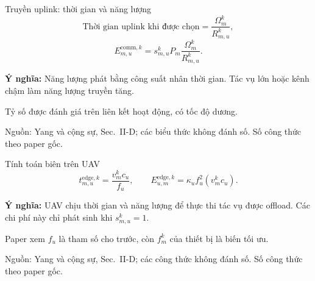 \documentclass[10pt,aspectratio=43]{beamer}
\newcommand{\source}[1]{\par\vfill{\fontsize{5.8}{7}\selectfont\color{Muted}Nguồn: #1\par}}
\newcommand{\paperref}[1]{\source{Yang và cộng sự, Sec.~#1. Số công thức theo paper gốc.}}
\newcommand{\eqmeaning}[1]{\par\medskip\textcolor{HustRed}{\textbf{Ý nghĩa:}} #1\par}
\newcommand{\noteonly}[1]{\par{\footnotesize\color{Muted}#1\par}}
\begin{document}
\begin{frame}[t]{Truyền uplink: thời gian và năng lượng}
\relax
\[
\text{Thời gian uplink khi được chọn}=\frac{\Omega_m^k}{R_{m,u}^k},
\]
\[
E_{m,u}^{\mathrm{comm},k}=s_{m,u}^kP_m\frac{\Omega_m^k}{R_{m,u}^k}.
\]
\par{}
\eqmeaning{Năng lượng phát bằng công suất nhân thời gian. Tác vụ lớn hoặc kênh chậm làm năng lượng truyền tăng.}
\noteonly{Tỷ số được đánh giá trên liên kết hoạt động, có tốc độ dương.}
\paperref{II-D; các biểu thức không đánh số}
\end{frame}

\begin{frame}[t]{Tính toán biên trên UAV}
\relax
\[
t_{m,u}^{\mathrm{edge},k}=\frac{v_m^kc_u}{f_u},\qquad
E_{u,m}^{\mathrm{edge},k}=\kappa_u f_u^2(v_m^kc_u).
\]
\par{}
\eqmeaning{UAV chịu thời gian và năng lượng để thực thi tác vụ được offload. Các chi phí này chỉ phát sinh khi $s_{m,u}^k=1$.}
\noteonly{Paper xem $f_u$ là tham số cho trước, còn $f_m^k$ của thiết bị là biến tối ưu.}
\paperref{II-D; các công thức không đánh số}
\end{frame}
\end{document}
